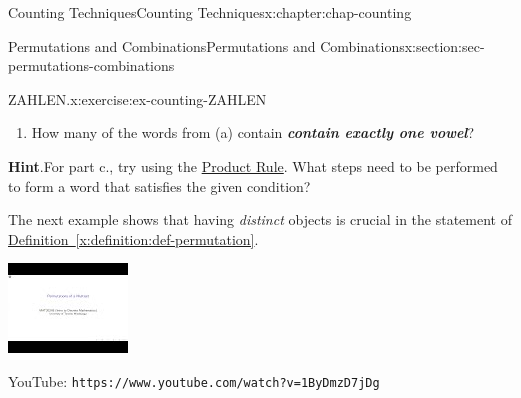 \documentclass[oneside,10pt,]{book}
\newcommand{\blocktitlefont}{\relax}
\newcommand{\xreffont}{\relax}
\newcommand{\mono}[1]{\texttt{#1}}
\newcommand{\alert}[1]{\textbf{\textit{#1}}}
\numberwithin{equation}{section}
\newlength{\qrsize}
\newlength{\previewwidth}
\begin{document}
\begin{chapterptx}{Counting Techniques}{}{Counting Techniques}{}{}{x:chapter:chap-counting}
\begin{sectionptx}{Permutations and Combinations}{}{Permutations and Combinations}{}{}{x:section:sec-permutations-combinations}
\begin{inlineexercise}{ZAHLEN.}{x:exercise:ex-counting-ZAHLEN}
\begin{enumerate}[label=(\alph*)]
\item{}How many of the words from (a) contain \alert{contain exactly one vowel}?%
\end{enumerate}
%
\par\smallskip%
\noindent\textbf{\blocktitlefont Hint}.\hypertarget{g:hint:id471533}{}\quad{}For part c., try using the \hyperref[x:principle:prin-prod-rule]{Product Rule}. What steps need to be performed to form a word that satisfies the given condition?%
\end{inlineexercise}
The next example shows that having \emph{distinct} objects is crucial in the statement of \hyperref[x:definition:def-permutation]{Definition~{\xreffont\ref{x:definition:def-permutation}}}.%
\begin{sidebyside}{1}{0}{0}{0}%
\begin{sbspanel}{1}%
\setlength{\qrsize}{9em}
\setlength{\previewwidth}{\linewidth}
\addtolength{\previewwidth}{-\qrsize}
\begin{tcbraster}[raster columns=2, raster column skip=1pt, raster halign=center, raster force size=false, raster left skip=0pt, raster right skip=0pt]%
\begin{tcolorbox}[previewstyle, width=\previewwidth]%
\includegraphics[width=0.80\linewidth,height=\qrsize,keepaspectratio]{images/video-permutation-multiset.jpg}%
\end{tcolorbox}%
\begin{tcolorbox}[qrstyle]%
{\hypersetup{urlcolor=black}}%
\end{tcolorbox}%
\begin{tcolorbox}[captionstyle]%
\small YouTube: \mono{https://www.youtube.com/watch?v=1ByDmzD7jDg}\end{tcolorbox}%
\end{tcbraster}%

\end{sbspanel}
\end{sidebyside}
\end{sectionptx}
\end{chapterptx}
\end{document}
